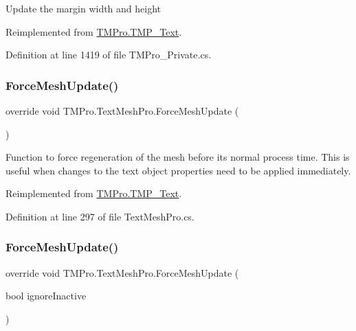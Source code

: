 Update the margin width and height 



Reimplemented from \mbox{\hyperlink{class_t_m_pro_1_1_t_m_p___text_a9e380bad2a5506d96b7c1d3b0b12d013}{T\+M\+Pro.\+T\+M\+P\+\_\+\+Text}}.



Definition at line 1419 of file T\+M\+Pro\+\_\+\+Private.\+cs.

\mbox{\label{class_t_m_pro_1_1_text_mesh_pro_a3b4ae4094196a6522a70ac86cdb30e02}} 
\subsubsection{\texorpdfstring{ForceMeshUpdate()}{ForceMeshUpdate()}\hspace{0.1cm}{\footnotesize\ttfamily [1/2]}}
{\footnotesize\ttfamily override void T\+M\+Pro.\+Text\+Mesh\+Pro.\+Force\+Mesh\+Update (\begin{DoxyParamCaption}{ }\end{DoxyParamCaption})\hspace{0.3cm}{\ttfamily [virtual]}}



Function to force regeneration of the mesh before its normal process time. This is useful when changes to the text object properties need to be applied immediately. 



Reimplemented from \mbox{\hyperlink{class_t_m_pro_1_1_t_m_p___text_a93c463ff2bb3b846a468f3d1764bdef4}{T\+M\+Pro.\+T\+M\+P\+\_\+\+Text}}.



Definition at line 297 of file Text\+Mesh\+Pro.\+cs.

\mbox{\label{class_t_m_pro_1_1_text_mesh_pro_adba5343dcc85a77bcd3dd57c22dd1753}} 
\subsubsection{\texorpdfstring{ForceMeshUpdate()}{ForceMeshUpdate()}\hspace{0.1cm}{\footnotesize\ttfamily [2/2]}}
{\footnotesize\ttfamily override void T\+M\+Pro.\+Text\+Mesh\+Pro.\+Force\+Mesh\+Update (\begin{DoxyParamCaption}\item[{bool}]{ignore\+Inactive }\end{DoxyParamCaption})\hspace{0.3cm}{\ttfamily [virtual]}}



